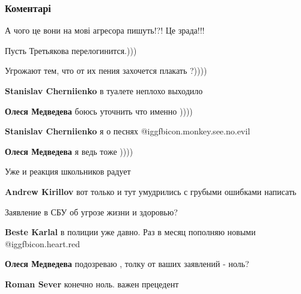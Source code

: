  
 
 
 
 
\subsubsection{Коментарі}

\begin{itemize} %
А чого це вони на мові агресора пишуть!?! Це зрада!!!

Пусть Третьякова перелогинится.)))

Угрожают тем, что от их пения захочется плакать ?))))

\begin{itemize} %
\textbf{Stanislav Cherniienko} в туалете неплохо выходило

\textbf{Олеся Медведева} боюсь уточнить что именно ))))

\textbf{Stanislav Cherniienko} я о песнях @igg{fbicon.monkey.see.no.evil} 

\textbf{Олеся Медведева} я ведь тоже ))))
\end{itemize} %

Уже и реакция школьников радует

\begin{itemize} %
\textbf{Andrew Kirillov} вот только и тут умудрились с грубыми ошибками написать
\end{itemize} %

Заявление в СБУ об угрозе жизни и здоровью?

\begin{itemize} %
\textbf{Beste Karlal} в полиции уже давно. Раз в месяц пополняю новыми  @igg{fbicon.heart.red}

\textbf{Олеся Медведева} подозреваю , толку от ваших заявлений - ноль?

\textbf{Roman Sever} конечно ноль. важен прецедент


\end{itemize}
\end{itemize}
